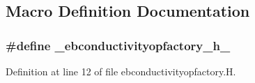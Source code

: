 \subsection{Macro Definition Documentation}
\subsubsection[{\texorpdfstring{\+\_\+ebconductivityopfactory\+\_\+h\+\_\+}{_ebconductivityopfactory_h_}}]{\setlength{\rightskip}{0pt plus 5cm}\#define \+\_\+ebconductivityopfactory\+\_\+h\+\_\+}\hypertarget{ebconductivityopfactory_8H_a92641a6e5f3761dfb893371cad712548}{}\label{ebconductivityopfactory_8H_a92641a6e5f3761dfb893371cad712548}


Definition at line 12 of file ebconductivityopfactory.\+H.

